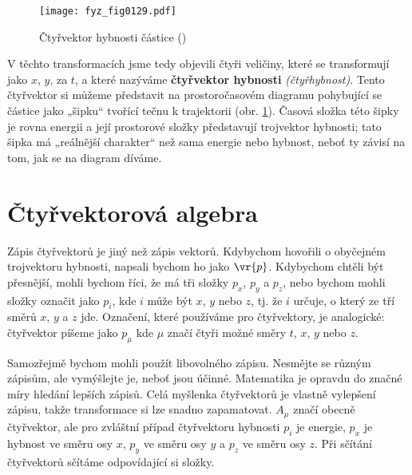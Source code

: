    \begin{figure}[ht!]  %
      \centering
      \texttt{[image: fyz\_fig0129.pdf]}
      \caption{Čtyřvektor hybnosti částice (\cite[s.~244]{Feynman01})}
      \label{fyz:fig0129}
    \end{figure}

    V těchto transformacích jsme tedy objevili čtyři veličiny, které se transformují jako \(x\),
    \(y\), za \(t\), a které nazýváme \textbf{čtyřvektor hybnosti} \emph{(čtyřhybnost)}. Tento
    čtyřvektor si můžeme představit na prostoročasovém diagramu pohybující se částice jako „šipku“
    tvořící tečnu k trajektorii (obr. \ref{fyz:fig0129}). Časová složka této šipky je rovna energii a
    její prostorové složky představují trojvektor hybnosti; tato šipka má „reálnější charakter“ než
    sama energie nebo hybnost, neboť ty závisí na tom, jak se na diagram díváme.
    
  \section{Čtyřvektorová algebra}\label{fyz:IchapXVIIsecV}
    Zápis čtyřvektorů je jiný než zápis vektorů. Kdybychom hovořili o obyčejném trojvektoru hybnosti,
    napsali bychom ho jako \(\vr{p}\). Kdybychom chtěli být přesnější, mohli bychom říci, že má tři
    složky \(p_x\), \(p_y\) a \(p_z\), nebo bychom mohli složky označit jako \(p_i\), kde \(i\) může
    být \(x\), \(y\) nebo \(z\), tj. že \(i\) určuje, o který ze tří směrů \(x\), \(y\) a \(z\) jde.
    Označení, které používáme pro čtyřvektory, je analogické: čtyřvektor píšeme jako \(p_\mu\) kde
    \(\mu\) značí čtyři možné směry \(t\), \(x\), \(y\) nebo \(z\).

    Samozřejmě bychom mohli použít libovolného zápisu. Nesmějte se různým zápisům, ale vymýšlejte
    je, neboť jsou účinné. Matematika je opravdu do značné míry hledání lepších zápisů. Celá
    myšlenka čtyřvektorů je vlastně vylepšení zápisu, takže transformace si lze snadno zapamatovat.
    \(A_\mu\) značí obecně čtyřvektor, ale pro zvláštní případ čtyřvektoru hybnosti \(p_i\) je
    energie, \(p_x\) je hybnost ve směru osy \(x\), \(p_y\) ve směru osy \(y\) a \(p_z\) ve směru
    osy \(z\). Při sčítání čtyřvektorů sčítáme odpovídající si složky.

